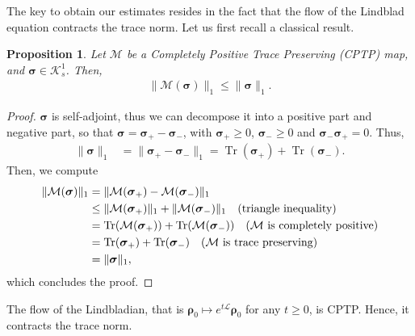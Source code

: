 \documentclass[a4paper,onecolumn,amsmath,amssymb,amsfonts,accepted=2026-03-06]{quantumarticle}
\newcommand{\xL}{\mathcal{L}}
\newcommand{\xtr}[1]{\operatorname{Tr}\left(#1 \right)}
\newcommand{\xK}{\mathcal{K}}
\newtheorem{proposition}{Proposition}
\begin{document}
The key to obtain our estimates resides in the fact that the flow of the Lindblad equation contracts the trace norm. Let us first recall a classical result.
\begin{proposition}{\cite[Lemma 1]{KOSSAKOWSKI1972247}}
    \label{prop:CPTP}
    Let $\mathcal{M}$ be a Completely Positive Trace Preserving (CPTP) map, and $\boldsymbol{\sigma}\in \xK_s^1$. Then,
    \begin{align}
        \|\mathcal{M}(\boldsymbol{\sigma})\|_1 \leq \|\boldsymbol{\sigma}\|_1.
    \end{align} 
\end{proposition}
\begin{proof}
    $\boldsymbol{\sigma}$ is self-adjoint, thus we can decompose it into a positive part and negative part, so that $\boldsymbol{\sigma}=\boldsymbol{\sigma}_+-\boldsymbol{\sigma}_-$, with $\boldsymbol{\sigma}_+\geq 0$, $\boldsymbol{\sigma}_- \geq 0$ and $\boldsymbol{\sigma}_- \boldsymbol{\sigma}_+ = 0$. Thus,
    \begin{align}
        \|\boldsymbol{\sigma}\|_1 &= \|\boldsymbol{\sigma}_+ - \boldsymbol{\sigma}_-\|_1 = \xtr{\boldsymbol{\sigma}_+} + \xtr{\boldsymbol{\sigma}_-}.
    \end{align}
    Then, we compute
    \begin{align}
        \|\mathcal{M}(\boldsymbol{\sigma})\|_1 &= \|\mathcal{M}(\boldsymbol{\sigma}_+) - \mathcal{M}(\boldsymbol{\sigma}_-)\|_1\notag\\
        &\leq \|\mathcal{M}(\boldsymbol{\sigma}_+)\|_1+\|\mathcal{M}(\boldsymbol{\sigma}_-)\|_1 \quad\text{(triangle inequality)}\notag\\
        &= \operatorname{Tr}(\mathcal{M}(\boldsymbol{\sigma}_+)) + \operatorname{Tr}(\mathcal{M}(\boldsymbol{\sigma}_-)) \quad\text{($\mathcal{M}$ is completely positive)}\notag\\
        &= \operatorname{Tr}(\boldsymbol{\sigma}_+) + \operatorname{Tr}(\boldsymbol{\sigma}_-) \quad\text{($\mathcal{M}$ is trace preserving)}\notag\\
        & = \|\boldsymbol{\sigma}\|_1,
    \end{align}
    which concludes the proof.
\end{proof}

The flow of the Lindbladian, that is $\boldsymbol{\rho}_0 \mapsto e^{t\xL}\boldsymbol{\rho}_0$ for any $t\geq 0$, is CPTP. Hence, it contracts the trace norm.
\end{document}
